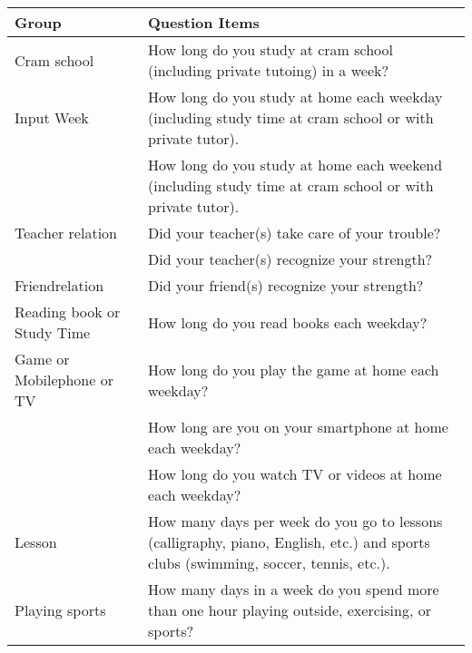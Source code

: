 \begin{tabular}{ll}
\hline \hline 
Group & Question Items \\
\hline 
Cram school & How long do you study at cram school (including private tutoing) in a week? \\
Input Week & How long do you study at home each weekday (including study time at cram school or with private tutor). \\
 & How long do you study at home each weekend (including study time at cram school or with private tutor). \\
Teacher relation & Did your teacher(s) take care of your trouble? \\
 & Did your teacher(s) recognize your strength? \\
Friendrelation & Did your friend(s) recognize your strength? \\
Reading book or Study Time & How long do you read books each weekday? \\
Game or Mobilephone or TV & How long do you play the game at home each weekday? \\
 & How long are you on your smartphone at home each weekday? \\
 & How long do you watch TV or videos at home each weekday? \\
Lesson & How many days per week do you go to lessons (calligraphy, piano, English, etc.) and sports clubs (swimming, soccer, tennis, etc.). \\
Playing sports & How many days in a week do you spend more than one hour playing outside, exercising, or sports? \\
\hline \hline
\end{tabular}